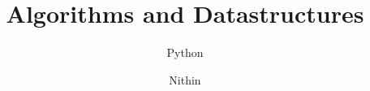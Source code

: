\documentclass{beamer}
\title{Algorithms and Datastructures}
\subtitle{Python}
\author{Nithin}
\begin{document}
\begin{frame}
    \titlepage 
\end{frame}
\end{document}
